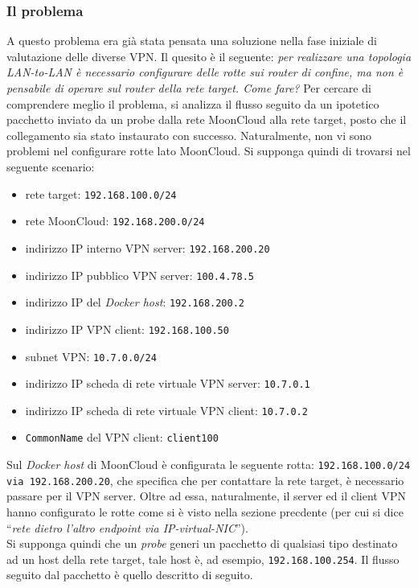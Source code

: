 \subsubsection{Il problema}
A questo problema era già stata pensata una soluzione nella fase iniziale di valutazione
delle diverse VPN. Il quesito è il seguente: \textit{per realizzare una topologia
LAN-to-LAN è necessario configurare delle rotte sui router di confine, ma non è
pensabile di operare sul router della rete target. Come fare?}
Per cercare di comprendere meglio il problema, si analizza il flusso seguito
da un ipotetico pacchetto inviato da un probe dalla rete MoonCloud alla rete target,
posto che il collegamento sia stato instaurato con successo. Naturalmente, non vi sono
problemi nel configurare rotte lato MoonCloud. Si supponga quindi di trovarsi nel
seguente scenario:
\begin{itemize}
  \item rete target: \texttt{192.168.100.0/24}
  \item rete MoonCloud: \texttt{192.168.200.0/24}
  \item indirizzo IP interno VPN server: \texttt{192.168.200.20}
  \item indirizzo IP pubblico VPN server: \texttt{100.4.78.5}
  \item indirizzo IP del \textit{Docker host}: \texttt{192.168.200.2}
  \item indirizzo IP VPN client: \texttt{192.168.100.50}
  \item subnet VPN: \texttt{10.7.0.0/24}
  \item indirizzo IP scheda di rete virtuale VPN server: \texttt{10.7.0.1}
  \item indirizzo IP scheda di rete virtuale VPN client: \texttt{10.7.0.2}
  \item \texttt{CommonName} del VPN client: \texttt{client100}
\end{itemize}
Sul \textit{Docker host} di MoonCloud è configurata le seguente rotta:
\texttt{192.168.100.0/24 via 192.168.200.20}, che specifica che per contattare la rete target,
è necessario passare per il VPN server. Oltre ad essa, naturalmente, il server ed il
client VPN hanno configurato le rotte come si è visto nella sezione precdente
(per cui si dice ``\textit{rete dietro l'altro endpoint via IP-virtual-NIC}'').\\
Si supponga quindi che un \textit{probe}  generi un pacchetto di qualsiasi tipo destinato
ad un host della rete target, tale host è, ad esempio, \texttt{192.168.100.254}.
Il flusso seguito dal pacchetto è quello descritto di seguito.
